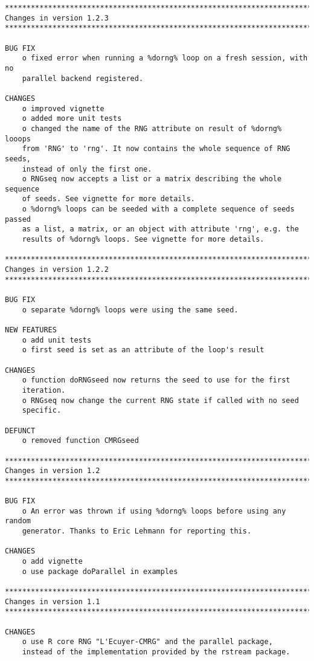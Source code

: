 \documentclass[a4paper,12pt]{article}\usepackage[]{graphicx}\usepackage[]{color}
\begin{document}
{\begin{verbatim}
*************************************************************************
Changes in version 1.2.3
*************************************************************************

BUG FIX
    o fixed error when running a %dorng% loop on a fresh session, with no  
    parallel backend registered.  

CHANGES
    o improved vignette
    o added more unit tests
    o changed the name of the RNG attribute on result of %dorng% looops 
    from 'RNG' to 'rng'. It now contains the whole sequence of RNG seeds, 
    instead of only the first one.
    o RNGseq now accepts a list or a matrix describing the whole sequence 
    of seeds. See vignette for more details.
    o %dorng% loops can be seeded with a complete sequence of seeds passed 
    as a list, a matrix, or an object with attribute 'rng', e.g. the 
    results of %dorng% loops. See vignette for more details.
    
*************************************************************************
Changes in version 1.2.2
*************************************************************************

BUG FIX
    o separate %dorng% loops were using the same seed.

NEW FEATURES
    o add unit tests
    o first seed is set as an attribute of the loop's result

CHANGES
    o function doRNGseed now returns the seed to use for the first 
    iteration.
    o RNGseq now change the current RNG state if called with no seed 
    specific.  
    
DEFUNCT
    o removed function CMRGseed

*************************************************************************
Changes in version 1.2
*************************************************************************

BUG FIX
    o An error was thrown if using %dorng% loops before using any random
    generator. Thanks to Eric Lehmann for reporting this.

CHANGES
    o add vignette
    o use package doParallel in examples

*************************************************************************
Changes in version 1.1
*************************************************************************

CHANGES
    o use R core RNG "L'Ecuyer-CMRG" and the parallel package, 
    instead of the implementation provided by the rstream package.

\end{verbatim}
}
\end{document}
